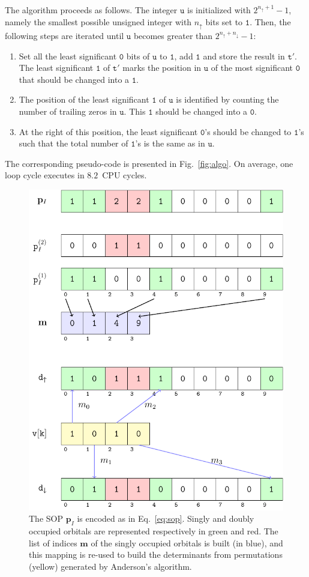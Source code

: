 \documentclass[aip,jcp,reprint,showkeys]{revtex4-1}
\newcommand{\tu}{\mathtt{u}}
\newcommand{\ttt}{\mathtt{t}}
\newcommand{\mpv}{\mathbf{p}}
\newcommand{\up}{\uparrow}
\newcommand{\dn}{\downarrow}
\newcommand{\one}{{\texttt{1}}}
\newcommand{\zero}{{\texttt{0}}}
\newcommand{\sop}{SOP}
\newcommand{\cpu}{CPU}
\begin{document}
The algorithm proceeds as follows. The integer $\tu$ is initialized with
$2^{n_\up+1}-1$, namely the smallest possible unsigned integer with $n_\up$
bits set to $\one$. 
Then, the following steps are iterated until $\tu$ becomes
greater than $2^{n_\up+n_\dn}-1$:
\begin{enumerate}
    \item Set all the least significant $\zero$ bits of $\tu$ to $\one$, add $\one$ and store the result in $\ttt'$. The least significant $\one$ of $\ttt'$ marks the position in $\tu$ of the most significant $\zero$ that should be changed into a $\one$.
    \item The position of the least significant $\one$ of $\tu$ is identified by counting the number of trailing zeros in $\tu$. This $\one$ should be changed into a $\zero$.
    \item At the right of this position, the least significant $\zero$'s should be changed to $\one$'s such that the total number of $\one$'s is the same as in $\tu$.
\end{enumerate}
The corresponding pseudo-code is presented in Fig.~\ref{fig:algo}. On average, one loop cycle executes in $8.2$~{\cpu} cycles.

\begin{figure}[t]
\includegraphics[width=0.9\columnwidth]{pattern.pdf} 
\caption{The {\sop} $\mpv_I$ is encoded as in Eq.~\eqref{eq:sop}. Singly and doubly
occupied orbitals are represented respectively in green and red.
The list of indices $\mathbf{m}$ of the singly occupied orbitals is built (in blue), and this
mapping is re-used to build the determinants from permutations (yellow) generated by Anderson's algorithm.}
\label{fig:mapping}
\end{figure}
\end{document}
